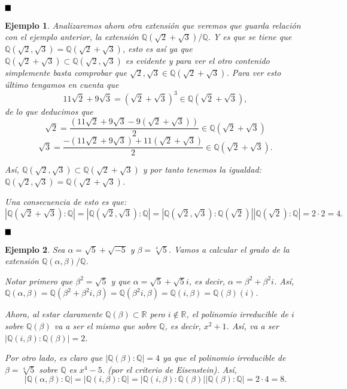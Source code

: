\documentclass[12pt]{article}
\newtheorem{example}{Ejemplo}[theorem]
\begin{document}
$\hfill \blacksquare$

\begin{example} Analizaremos ahora otra extensión que veremos que guarda relación con el ejemplo anterior, la extensión $\mathbb{Q}(\sqrt{2}+\sqrt{3})/\mathbb{Q}$. Y es que se tiene que $\mathbb{Q}(\sqrt{2}, \sqrt{3}) = \mathbb{Q}(\sqrt{2}+\sqrt{3})$, esto es así ya que $\mathbb{Q}(\sqrt{2}+\sqrt{3}) \subset \mathbb{Q}(\sqrt{2}, \sqrt{3})$ es evidente y para ver el otro contenido simplemente basta comprobar que $\sqrt{2}, \sqrt{3} \in \mathbb{Q}(\sqrt{2}+\sqrt{3})$. Para ver esto último tengamos en cuenta que $$11\sqrt{2} + 9\sqrt{3} = (\sqrt{2}+ \sqrt{3})^{3} \in \mathbb{Q}(\sqrt{2}+\sqrt{3}),$$ de lo que deducimos que $$\sqrt{2} = \dfrac{(11\sqrt{2} + 9\sqrt{3}-9(\sqrt{2}+\sqrt{3}))}{2} \in \mathbb{Q}(\sqrt{2}+\sqrt{3}) $$ $$\sqrt{3} = \dfrac{-(11\sqrt{2} + 9\sqrt{3})+11(\sqrt{2} + \sqrt{3})}{2} \in \mathbb{Q}(\sqrt{2}+\sqrt{3}).$$

Así, $\mathbb{Q}(\sqrt{2}, \sqrt{3}) \subset \mathbb{Q}(\sqrt{2}+\sqrt{3})$ y por tanto tenemos la igualdad: $\mathbb{Q}(\sqrt{2}, \sqrt{3}) = \mathbb{Q}(\sqrt{2}+\sqrt{3})$.

Una consecuencia de esto es que: $$|\mathbb{Q}(\sqrt{2} + \sqrt{3}) : \mathbb{Q}| = |\mathbb{Q}(\sqrt{2}, \sqrt{3}) : \mathbb{Q}| = |\mathbb{Q}(\sqrt{2}, \sqrt{3}) : \mathbb{Q}(\sqrt{2})| |\mathbb{Q}(\sqrt{2}): \mathbb{Q}| = 2 \cdot 2 = 4.$$
\end{example}

$\hfill \blacksquare$

\begin{example}Sea $\alpha = \sqrt{5} + \sqrt{-5}$ y $\beta = \sqrt[4]{5}$. Vamos a calcular el grado de la extensión $\mathbb{Q}(\alpha, \beta) /\mathbb{Q}$.

Notar primero que $\beta^{2} = \sqrt{5}$ y que $\alpha = \sqrt{5} + \sqrt{5}i$, es decir, $\alpha = \beta^{2} + \beta^{2}i$. Así, $\mathbb{Q}(\alpha, \beta) = \mathbb{Q}(\beta^{2} + \beta^{2}i, \beta) = \mathbb{Q}(\beta^{2}i, \beta) = \mathbb{Q}(i, \beta) = \mathbb{Q}(\beta) (i)$. 

Ahora, al estar claramente $\mathbb{Q}(\beta) \subset \mathbb{R}$ pero $i \notin \mathbb{R}$, el polinomio irreducible de $i$ sobre $\mathbb{Q}(\beta)$ va a ser el mismo que sobre $\mathbb{Q}$, es decir, $x^{2}+1$. Así, va a ser $|\mathbb{Q}(i,\beta) : \mathbb{Q}(\beta)| = 2$.

Por otro lado, es claro que $|\mathbb{Q}(\beta) : \mathbb{Q}| = 4$ ya que el polinomio irreducible de $\beta = \sqrt[4]{5}$ sobre $\mathbb{Q}$ es $x^{4}-5$. (por el criterio de Eisenstein). Así, $$|\mathbb{Q}(\alpha, \beta) : \mathbb{Q}| = |\mathbb{Q}(i, \beta) : \mathbb{Q}| = |\mathbb{Q}(i, \beta) : \mathbb{Q}(\beta)| |\mathbb{Q}(\beta) : \mathbb{Q}| = 2 \cdot 4 = 8.$$
\end{example}
\end{document}
